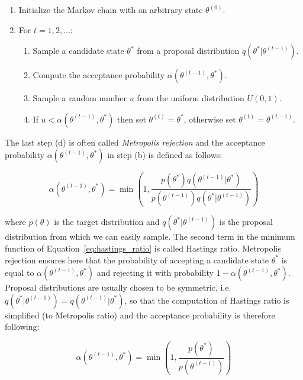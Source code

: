 \begin{enumerate}
    \item Initialize the Markov chain with an arbitrary state $\theta^{(0)}$.
    \item For $t = 1,2,\dots$:
    \begin{enumerate}
        \item Sample a candidate state $\theta^*$ from a proposal distribution $q(\theta^*|\theta^{(t-1)})$.
        \item Compute the acceptance probability $\alpha(\theta^{(t-1)},\theta^*)$.
        \item Sample a random number $u$ from the uniform distribution $U(0,1)$.
        \item If $u < \alpha(\theta^{(t-1)},\theta^*)$ then set $\theta^{(t)} = \theta^*$, otherwise set $\theta^{(t)} = \theta^{(t-1)}$.
    \end{enumerate}
\end{enumerate}

The last step (d) is often called \textit{Metropolis rejection} and the acceptance probability $\alpha(\theta^{(t-1)},\theta^*)$ in step (b) is defined as follows:

\begin{equation} \label{eq:hastings_ratio}
    \alpha(\theta^{(t-1)},\theta^*) = \min \left(1,\frac{p(\theta^*)q(\theta^{(t-1)}|\theta^*)}{p(\theta^{(t-1)})q(\theta^*|\theta^{(t-1)})}\right)
\end{equation}

where $p(\theta)$ is the target distribution and $q(\theta^*|\theta^{(t-1)})$ is the proposal distribution from which we can easily sample.
The second term in the minimum function of Equation~\ref{eq:hastings_ratio} is called Hastings ratio. Metropolis rejection ensures here that 
the probability of accepting a candidate state $\theta^*$ is equal to $\alpha(\theta^{(t-1)},\theta^*)$ and rejecting it with probability $1 - \alpha(\theta^{(t-1)},\theta^*)$.
Proposal distributions are usually chosen to be symmetric, i.e. $q(\theta^*|\theta^{(t-1)}) = q(\theta^{(t-1)}|\theta^*)$, 
so that the computation of Hastings ratio is simplified (to Metropolis ratio) and the acceptance probability is therefore following:

\begin{equation}
    \alpha(\theta^{(t-1)},\theta^*) = \min \left(1,\frac{p(\theta^*)}{p(\theta^{(t-1)})}\right)
\end{equation}

